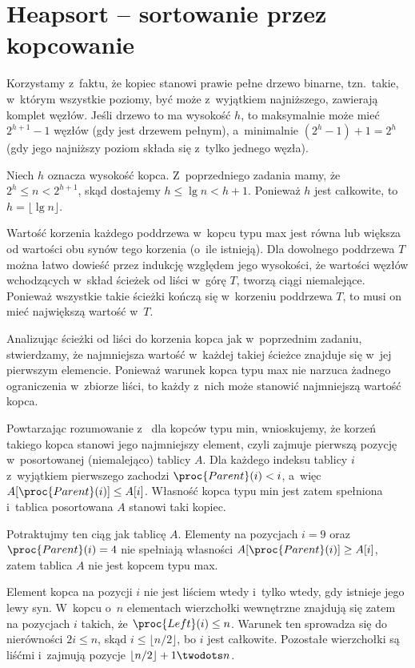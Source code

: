 \chapter{Heapsort -- sortowanie przez kopcowanie}


\exercise %
Korzystamy z~faktu, że kopiec stanowi prawie pełne drzewo binarne, tzn.\ takie, w~którym wszystkie poziomy, być może z~wyjątkiem najniższego, zawierają komplet węzłów.
Jeśli drzewo to ma wysokość $h$, to maksymalnie może mieć $2^{h+1}-1$ węzłów (gdy jest drzewem pełnym), a~minimalnie $(2^h-1)+1=2^h$ (gdy jego najniższy poziom składa się z~tylko jednego węzła).

\exercise %
Niech $h$ oznacza wysokość kopca.
Z~poprzedniego zadania mamy, że $2^h\le n<2^{h+1}$, skąd dostajemy $h\le\lg n<h+1$.
Ponieważ $h$ jest całkowite, to $h=\lfloor\lg n\rfloor$.

\exercise %
Wartość korzenia każdego poddrzewa w~kopcu typu max jest równa lub większa od wartości obu synów tego korzenia (o~ile istnieją).
Dla dowolnego poddrzewa $T$ można łatwo dowieść przez indukcję względem jego wysokości, że wartości węzłów wchodzących w~skład ścieżek od liści w~górę $T$, tworzą ciągi niemalejące.
Ponieważ wszystkie takie ścieżki kończą się w~korzeniu poddrzewa $T$, to musi on mieć największą wartość w~$T$.

\exercise %
Analizując ścieżki od liści do korzenia kopca jak w~poprzednim zadaniu, stwierdzamy, że najmniejsza wartość w~każdej takiej ścieżce znajduje się w~jej pierwszym elemencie.
Ponieważ warunek kopca typu max nie narzuca żadnego ograniczenia w~zbiorze liści, to każdy z~nich może stanowić najmniejszą wartość kopca.

\exercise %
Powtarzając rozumowanie z~ dla kopców typu min, wnioskujemy, że korzeń takiego kopca stanowi jego najmniejszy element, czyli zajmuje pierwszą pozycję w~posortowanej (niemalejąco) tablicy $A$.
Dla każdego indeksu tablicy $i$ z~wyjątkiem pierwszego zachodzi $\proc{Parent}(i)<i$, a~więc $A[\proc{Parent}(i)]\le A[i]$.
Własność kopca typu min jest zatem spełniona i~tablica posortowana $A$ stanowi taki kopiec.

\exercise %
Potraktujmy ten ciąg jak tablicę $A$.
Elementy na pozycjach $i=9$ oraz $\proc{Parent}(i)=4$ nie spełniają własności $A[\proc{Parent}(i)]\ge A[i]$, zatem tablica $A$ nie jest kopcem typu max.

\exercise %
Element kopca na pozycji $i$ nie jest liściem wtedy i~tylko wtedy, gdy istnieje jego lewy syn.
W~kopcu o~$n$ elementach wierzchołki wewnętrzne znajdują się zatem na pozycjach $i$ takich, że $\proc{Left}(i)\le n$.
Warunek ten sprowadza się do nierówności $2i\le n$, skąd $i\le\lfloor n/2\rfloor$, bo $i$ jest całkowite.
Pozostałe wierzchołki są liśćmi i~zajmują pozycje $\lfloor n/2\rfloor+1\twodots n$.

